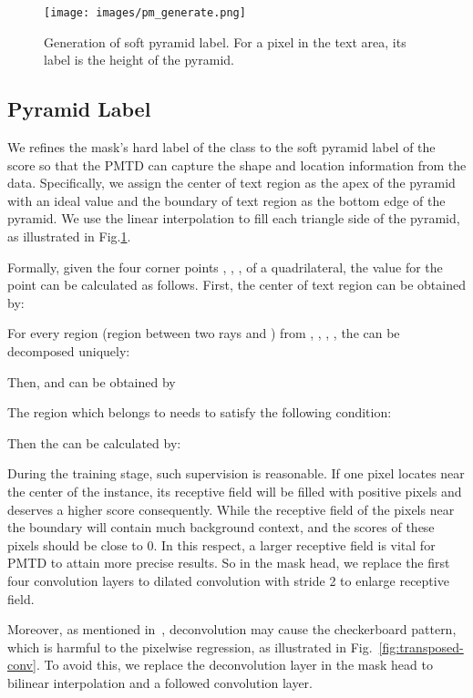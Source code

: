 \documentclass[10pt,twocolumn,letterpaper]{article}
\begin{document}
\begin{figure}
    \texttt{[image: images/pm\_generate.png]}
    \vspace{5pt}
    \caption{Generation of soft pyramid label. For a pixel in the text area, its label is the height of the pyramid.}
    \label{fig:pm_generate}
\end{figure}

\subsection{Pyramid Label}\label{subsec:pyramid-mask}
We refines the mask's hard label of the class   to the soft pyramid label of the score   so that the PMTD can capture the shape and location information from the data. Specifically, we assign the center of text region as the apex of the pyramid with an ideal value  and the boundary of text region as the bottom edge of the pyramid. We use the linear interpolation to fill each triangle side of the pyramid, as illustrated in Fig.\ref{fig:pm_generate}.

Formally, given the four corner points , , ,  of a quadrilateral, the value  for the point  can be calculated as follows. First, the center of text region  can be obtained by:

For every region  (region between two rays  and ) from , , , , the  can be decomposed uniquely:

    Then,  and  can be obtained by
    
The region  which  belongs to needs to satisfy the following condition:

Then the  can be calculated by:


During the training stage, such supervision is reasonable. If one pixel locates near the center of the instance, its receptive field will be filled with positive pixels and deserves a higher score consequently. While the receptive field of the pixels near the boundary will contain much background context, and the scores of these pixels should be close to 0. In this respect, a larger receptive field is vital for PMTD to attain more precise results. So in the mask head, we replace the first four convolution layers to dilated convolution with stride 2 to enlarge receptive field.

Moreover, as mentioned in~\cite{odena2016deconvolution}, deconvolution may cause the checkerboard pattern, which is harmful to the pixelwise regression, as illustrated in Fig.~\ref{fig:transposed-conv}. To avoid this, we replace the deconvolution layer in the mask head to bilinear interpolation and a followed convolution layer.
\end{document}
